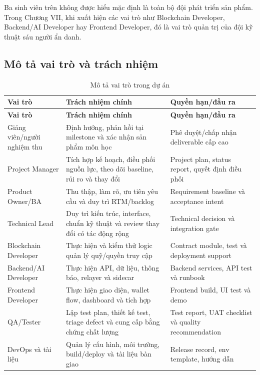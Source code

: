 Ba sinh viên trên không được hiểu mặc định là toàn bộ đội phát triển sản phẩm. Trong Chương VII, khi xuất hiện các vai trò như Blockchain Developer, Backend/AI Developer hay Frontend Developer, đó là vai trò quản trị của đội kỹ thuật sáu người ẩn danh.

\iffalse
\subsection{Mô tả vai trò và trách nhiệm}

\begin{longtable}{| p{3.1cm} | p{5.7cm} | p{4.3cm} |}
\caption{Mô tả vai trò trong dự án}\label{tab:role-description}\\
\hline
\textbf{Vai trò} & \textbf{Trách nhiệm chính} & \textbf{Quyền hạn/đầu ra} \\
\hline
\endfirsthead
\hline
\textbf{Vai trò} & \textbf{Trách nhiệm chính} & \textbf{Quyền hạn/đầu ra} \\
\hline
\endhead
Giảng viên/người nghiệm thu & Định hướng, phản hồi tại milestone và xác nhận sản phẩm môn học & Phê duyệt/chấp nhận deliverable cấp cao \\ \hline
Project Manager & Tích hợp kế hoạch, điều phối nguồn lực, theo dõi baseline, rủi ro và thay đổi & Project plan, status report, quyết định điều phối \\ \hline
Product Owner/BA & Thu thập, làm rõ, ưu tiên yêu cầu và duy trì RTM/backlog & Requirement baseline và acceptance intent \\ \hline
Technical Lead & Duy trì kiến trúc, interface, chuẩn kỹ thuật và review thay đổi có tác động rộng & Technical decision và integration gate \\ \hline
Blockchain Developer & Thực hiện và kiểm thử logic quản lý quỹ/quyền truy cập & Contract module, test và deployment support \\ \hline
Backend/AI Developer & Thực hiện API, dữ liệu, thông báo, relayer và sidecar & Backend services, API test và runbook \\ \hline
Frontend Developer & Thực hiện giao diện, wallet flow, dashboard và tích hợp & Frontend build, UI test và demo \\ \hline
QA/Tester & Lập test plan, thiết kế test, triage defect và cung cấp bằng chứng chất lượng & Test report, UAT checklist và quality recommendation \\ \hline
DevOps và tài liệu & Quản lý cấu hình, môi trường, build/deploy và tài liệu bàn giao & Release record, env template, hướng dẫn \\
\hline
\end{longtable}

